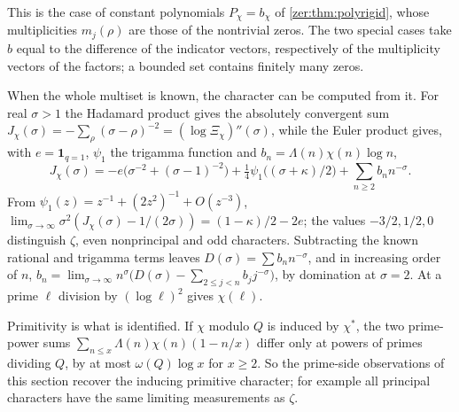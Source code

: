 This is the case of constant polynomials $P_\chi=b_\chi$ of \cref{zer:thm:polyrigid}, whose multiplicities
$m_j(\rho)$ are those of the nontrivial zeros. The two special cases take $b$ equal to the difference of the
indicator vectors, respectively of the multiplicity vectors of the factors; a bounded set contains finitely
many zeros.

\begin{remark}\label{rec:rem:readchar}
When the whole multiset is known, the character can be computed from it. For real
$\sigma>1$ the Hadamard product gives the absolutely convergent sum
$J_\chi(\sigma)=-\sum_\rho(\sigma-\rho)^{-2}=(\log\Xi_\chi)''(\sigma)$, while the Euler product
gives, with $e=\mathbf 1_{q=1}$, $\psi_1$ the trigamma function and
$b_n=\Lambda(n)\chi(n)\log n$,
\[
 J_\chi(\sigma)=-e\bigl(\sigma^{-2}+(\sigma-1)^{-2}\bigr)+\tfrac14\psi_1\bigl((\sigma+\kappa)/2\bigr)
 +\sum_{n\ge2}b_nn^{-\sigma}.
\]
From $\psi_1(z)=z^{-1}+(2z^2)^{-1}+O(z^{-3})$,
$\lim_{\sigma\to\infty}\sigma^2(J_\chi(\sigma)-1/(2\sigma))=(1-\kappa)/2-2e$; the values
$-3/2,1/2,0$ distinguish $\zeta$, even nonprincipal and odd characters. Subtracting the known
rational and trigamma terms leaves $D(\sigma)=\sum b_nn^{-\sigma}$, and in increasing order of
$n$, $b_n=\lim_{\sigma\to\infty}n^\sigma\bigl(D(\sigma)-\sum_{2\le j<n}b_jj^{-\sigma}\bigr)$, by
domination at $\sigma=2$. At a prime $\ell$ division by $(\log\ell)^2$ gives $\chi(\ell)$.
\end{remark}

Primitivity is what is identified. If $\chi$ modulo $Q$ is induced by $\chi^*$, the two
prime-power sums $\sum_{n\le x}\Lambda(n)\chi(n)(1-n/x)$ differ only at powers of primes dividing
$Q$, by at most $\omega(Q)\log x$ for $x\ge2$. So the prime-side observations of this section
recover the inducing primitive character; for example all principal characters have the
same limiting measurements as $\zeta$.

